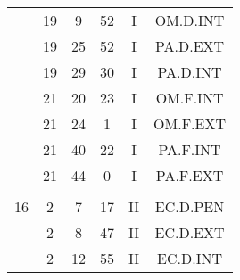 \documentclass[12pt, a4paper]{article}
\begin{document}
\begin{multicols}{3}
{\begin{tabular}{c c c c c c}
	 	 	 	 & 19 & 9 & 52 & I & OM.D.INT\\%
	 	 	 	 & 19 & 25 & 52 & I & PA.D.EXT\\%
	 	 	 	 & 19 & 29 & 30 & I & PA.D.INT\\%
	 	 	 	 & 21 & 20 & 23 & I & OM.F.INT\\%
	 	 	 	 & 21 & 24 & 1 & I & OM.F.EXT\\%
	 	 	 	 & 21 & 40 & 22 & I & PA.F.INT\\%
	 	 	 	 & 21 & 44 & 0 & I & PA.F.EXT\\%
	 	 	 	 & & & & & \\%
	 	 	 	16 & 2 & 7 & 17 & II & EC.D.PEN\\%
	 	 	 	 & 2 & 8 & 47 & II & EC.D.EXT\\%
	 	 	 	 & 2 & 12 & 55 & II & EC.D.INT\\%
	 	 \end{tabular}
 	}
\end{multicols}
\end{document}
